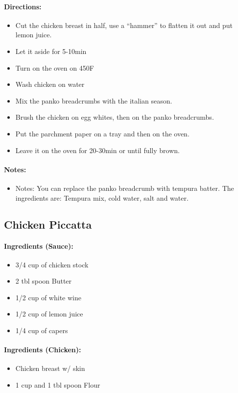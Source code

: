 \documentclass{article}
\begin{document}
\paragraph{Directions:}
\begin{itemize}
	\item Cut the chicken breast in half, use a “hammer” to flatten it out and put lemon juice.
	\item Let it aside for 5-10min
	\item Turn on the oven on 450F
	\item Wash chicken on water
	\item Mix the panko breadcrumbs with the italian season.
	\item Brush the chicken on egg whites, then on the panko breadcrumbs.
	\item Put the parchment paper on a tray and then on the oven.
	\item Leave it on the oven for 20-30min or until fully brown.
\end{itemize}

\paragraph{Notes:}
\begin{itemize}
	\item Notes: You can replace the panko breadcrumb with tempura batter. The ingredients are: Tempura mix, cold water, salt and water.
\end{itemize}

\subsection{Chicken Piccatta}

\paragraph{Ingredients (Sauce):}
\begin{itemize}
	\item 3/4 cup of chicken stock
	\item 2 tbl spoon Butter
	\item 1/2 cup of white wine
	\item 1/2 cup of lemon juice
	\item 1/4 cup of capers
\end{itemize}

\paragraph{Ingredients (Chicken):}
\begin{itemize}
	\item Chicken breast w/ skin
	\item 1 cup and 1 tbl spoon Flour
\end{itemize}
\end{document}
